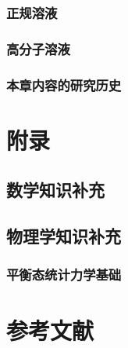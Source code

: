 \documentclass[
  zihao=5,
  linespread=1.3,
  a4paper,
  heading=true,
  twoside
]{ctexbook}
\theoremstyle{definition}
\theoremstyle{plain}
\begin{document}
\section{正规溶液}

\section{高分子溶液}

% 
\section{本章内容的研究历史}


\part*{附录}
\chapter{数学知识补充}

\chapter{物理学知识补充}
\section{平衡态统计力学基础}


\newpage\part*{参考文献}
\printbibliography[heading=none]
\end{document}
